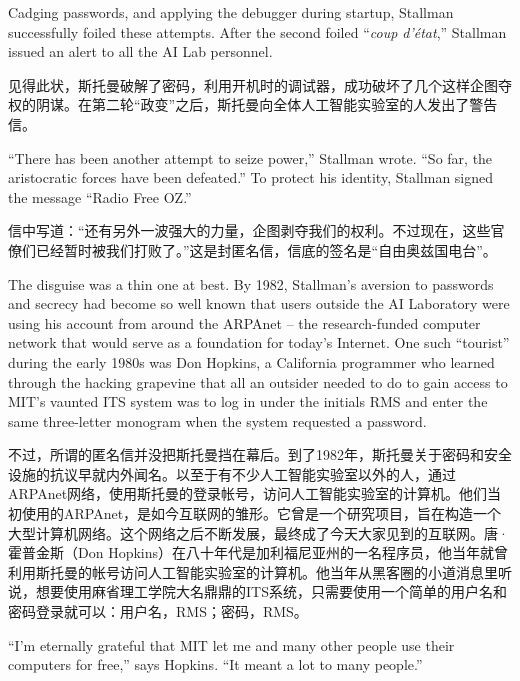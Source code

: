 \ifdefined\eng
Cadging passwords, and applying the debugger during startup, Stallman successfully foiled these attempts. After the second foiled ``\textit{coup d'état},'' Stallman issued an alert to all the AI Lab personnel.
\fi

\ifdefined\chs
见得此状，斯托曼破解了密码，利用开机时的调试器，成功破坏了几个这样企图夺权的阴谋。在第二轮``政变''之后，斯托曼向全体人工智能实验室的人发出了警告信。
\fi

\ifdefined\eng
``There has been another attempt to seize power,'' Stallman wrote. ``So far, the aristocratic forces have been defeated.'' To protect his identity, Stallman signed the message ``Radio Free OZ.''
\fi

\ifdefined\chs
信中写道：``还有另外一波强大的力量，企图剥夺我们的权利。不过现在，这些官僚们已经暂时被我们打败了。''这是封匿名信，信底的签名是``自由奥兹国电台''。
\fi

\ifdefined\eng
The disguise was a thin one at best. By 1982, Stallman's aversion to passwords and secrecy had become so well known that users outside the AI Laboratory were using his account from around the ARPAnet -- the research-funded computer network that would serve as a foundation for today's Internet. One such ``tourist'' during the early 1980s was Don Hopkins, a California programmer who learned through the hacking grapevine that all an outsider needed to do to gain access to MIT's vaunted ITS system was to log in under the initials RMS and enter the same three-letter monogram when the system requested a password.
\fi

\ifdefined\chs
不过，所谓的匿名信并没把斯托曼挡在幕后。到了1982年，斯托曼关于密码和安全设施的抗议早就内外闻名。以至于有不少人工智能实验室以外的人，通过ARPAnet网络，使用斯托曼的登录帐号，访问人工智能实验室的计算机。他们当初使用的ARPAnet，是如今互联网的雏形。它曾是一个研究项目，旨在构造一个大型计算机网络。这个网络之后不断发展，最终成了今天大家见到的互联网。唐·霍普金斯（Don Hopkins）在八十年代是加利福尼亚州的一名程序员，他当年就曾利用斯托曼的帐号访问人工智能实验室的计算机。他当年从黑客圈的小道消息里听说，想要使用麻省理工学院大名鼎鼎的ITS系统，只需要使用一个简单的用户名和密码登录就可以：用户名，RMS；密码，RMS。
\fi

\ifdefined\eng
``I'm eternally grateful that MIT let me and many other people use their computers for free,'' says Hopkins. ``It meant a lot to many people.''
\fi

